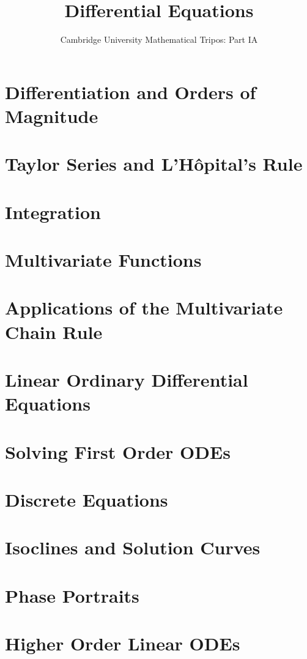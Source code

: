 \documentclass{article}
\title{Differential Equations}
\author{Cambridge University Mathematical Tripos: Part IA}
\begin{document}
\maketitle

\tableofcontentsnewpage{}

\section{Differentiation and Orders of Magnitude}

\section{Taylor Series and L'H\^opital's Rule}

\section{Integration}

\section{Multivariate Functions}

\section{Applications of the Multivariate Chain Rule}

\section{Linear Ordinary Differential Equations}

\section{Solving First Order ODEs}

\section{Discrete Equations}

\section{Isoclines and Solution Curves}

\section{Phase Portraits}

\section{Higher Order Linear ODEs}

\end{document}
